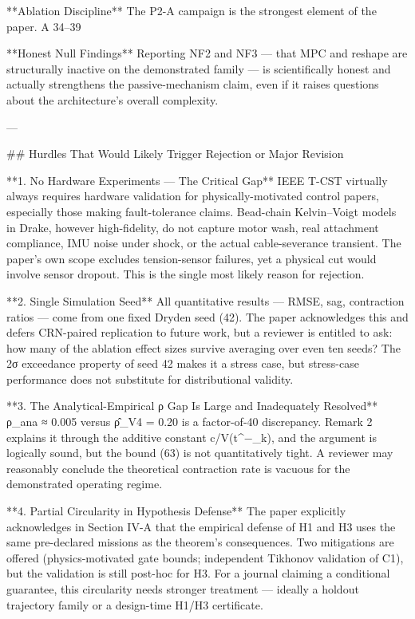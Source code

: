 **Ablation Discipline**
The P2-A campaign is the strongest element of the paper. A 34–39%

**Honest Null Findings**
Reporting NF2 and NF3 — that MPC and reshape are structurally inactive on the demonstrated family — is scientifically honest and actually strengthens the passive-mechanism claim, even if it raises questions about the architecture's overall complexity.

---

## Hurdles That Would Likely Trigger Rejection or Major Revision

**1. No Hardware Experiments — The Critical Gap**
IEEE T-CST virtually always requires hardware validation for physically-motivated control papers, especially those making fault-tolerance claims. Bead-chain Kelvin–Voigt models in Drake, however high-fidelity, do not capture motor wash, real attachment compliance, IMU noise under shock, or the actual cable-severance transient. The paper's own scope excludes tension-sensor failures, yet a physical cut would involve sensor dropout. This is the single most likely reason for rejection.

**2. Single Simulation Seed**
All quantitative results — RMSE, sag, contraction ratios — come from one fixed Dryden seed (42). The paper acknowledges this and defers CRN-paired replication to future work, but a reviewer is entitled to ask: how many of the ablation effect sizes survive averaging over even ten seeds? The 2σ exceedance property of seed 42 makes it a stress case, but stress-case performance does not substitute for distributional validity.

**3. The Analytical-Empirical ρ Gap Is Large and Inadequately Resolved**
ρ_ana ≈ 0.005 versus ρ̂_V4 = 0.20 is a factor-of-40 discrepancy. Remark 2 explains it through the additive constant c/V(t^−_k), and the argument is logically sound, but the bound (63) is not quantitatively tight. A reviewer may reasonably conclude the theoretical contraction rate is vacuous for the demonstrated operating regime.

**4. Partial Circularity in Hypothesis Defense**
The paper explicitly acknowledges in Section IV-A that the empirical defense of H1 and H3 uses the same pre-declared missions as the theorem's consequences. Two mitigations are offered (physics-motivated gate bounds; independent Tikhonov validation of C1), but the validation is still post-hoc for H3. For a journal claiming a conditional guarantee, this circularity needs stronger treatment — ideally a holdout trajectory family or a design-time H1/H3 certificate.

